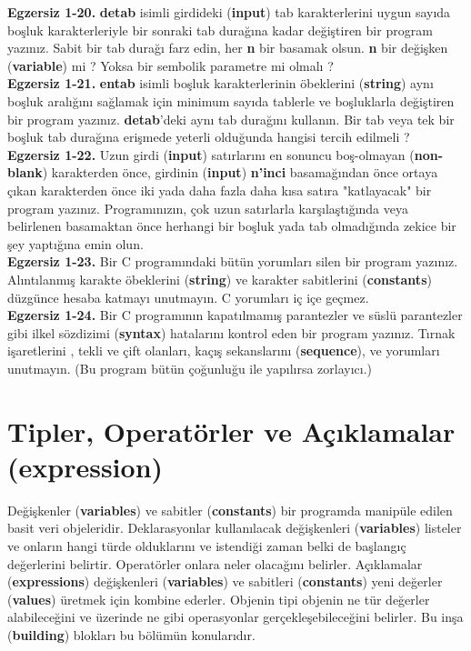 \documentclass[a4paper,12pt,oneside]{book}
\begin{document}
\noindent \textbf{Egzersiz 1-20.} \textbf{detab} isimli girdideki (\textbf{input}) tab karakterlerini uygun sayıda boşluk karakterleriyle bir sonraki tab durağına kadar değiştiren bir program yazınız. Sabit bir tab durağı farz edin, her \textbf{n} bir basamak olsun. \textbf{n} bir değişken (\textbf{variable}) mi ? Yoksa bir sembolik parametre mi olmalı ?\\

\noindent \textbf{Egzersiz 1-21.} \textbf{entab} isimli boşluk karakterlerinin öbeklerini (\textbf{string}) aynı boşluk aralığını sağlamak için minimum sayıda tablerle ve boşluklarla değiştiren bir program yazınız. \textbf{detab}'deki aynı tab durağını kullanın. Bir tab veya tek bir boşluk tab durağına erişmede yeterli olduğunda hangisi tercih edilmeli ? \\

\noindent \textbf{Egzersiz 1-22.} Uzun girdi (\textbf{input}) satırlarını en sonuncu boş-olmayan (\textbf{non-blank}) karakterden önce, girdinin (\textbf{input}) \textbf{n'inci} basamağından önce ortaya çıkan karakterden önce iki yada daha fazla daha kısa satıra "katlayacak" bir program yazınız. Programınızın, çok uzun satırlarla karşılaştığında veya belirlenen basamaktan önce herhangi bir boşluk yada tab olmadığında zekice bir şey yaptığına emin olun. \\

\noindent \textbf{Egzersiz 1-23.} Bir C programındaki bütün yorumları silen bir program yazınız. Alıntılanmış karakte öbeklerini (\textbf{string}) ve karakter sabitlerini (\textbf{constants}) düzgünce hesaba katmayı unutmayın. C yorumları iç içe geçmez. \\

\noindent \textbf{Egzersiz 1-24.} Bir C programının kapatılmamış parantezler ve süslü parantezler gibi ilkel sözdizimi (\textbf{syntax}) hatalarını kontrol eden bir program yazınız. Tırnak işaretlerini , tekli ve çift olanları, kaçış sekanslarını (\textbf{sequence}), ve yorumları unutmayın. (Bu program bütün çoğunluğu ile yapılırsa zorlayıcı.)\\

\chapter{Tipler, Operatörler ve Açıklamalar (expression)}

Değişkenler (\textbf{variables}) ve sabitler (\textbf{constants}) bir programda manipüle edilen basit veri objeleridir. Deklarasyonlar kullanılacak değişkenleri (\textbf{variables}) listeler ve onların hangi türde olduklarını ve istendiği zaman belki de başlangıç değerlerini belirtir. Operatörler onlara neler olacağını belirler. Açıklamalar (\textbf{expressions}) değişkenleri (\textbf{variables}) ve sabitleri (\textbf{constants}) yeni değerler (\textbf{values}) üretmek için kombine ederler. Objenin tipi objenin ne tür değerler alabileceğini ve üzerinde ne gibi operasyonlar gerçekleşebileceğini belirler. Bu inşa (\textbf{building}) blokları bu bölümün konularıdır. \\
\end{document}
